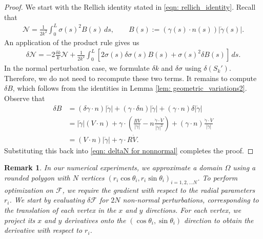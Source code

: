 \documentclass{amsart}
\theoremstyle{plain}
\newtheorem{remark}[theorem]{Remark}
\begin{document}
\begin{proof}
  We start with the Rellich identity stated in \eqref{eqn: rellich_identity}.
  Recall that
    \begin{align}
      \mathcal{N} = \frac{1}{2k^2}\int_0^L\sigma(s)^2B(s)\,ds,\quad\quad B(s):=(\gamma(s)\cdot n(s))|\dot\gamma(s)|.
    \end{align}
  An application of the product rule gives us 
    \begin{align}\label{eqn: deltaN for nonnormal}
      \delta\mathcal{N}
      =-2\frac{\delta k}{k}\mathcal{N}+\frac{1}{2k^2}\int_0^L\left[2\sigma(s)\delta\sigma(s) B(s) + \sigma(s)^2\delta B(s)
      \right]\,ds.
    \end{align}
  In the normal perturbation case, we formulate $\delta k$ and $\delta\sigma$ using $\delta(S_k')$.
  Therefore, we do not need to recompute these two terms.
  It remains to compute $\delta B$, which follows from the identities in Lemma \ref{lem: geometric_variations2}.
  Observe that
  \begin{equation}
    \begin{aligned}
      \delta B
      &=(\delta\gamma\cdot n)|\dot\gamma|+(\gamma\cdot\delta n)|\dot\gamma|+(\gamma\cdot n)\delta|\dot\gamma|\\
      &=|\dot\gamma|(V\cdot n) 
      +\gamma\cdot\left(\frac{R\dot V}{|\dot\gamma|}-n\frac{\dot\gamma\cdot\dot V}{|\dot\gamma|^2}\right)
      +(\gamma\cdot n)\frac{\dot\gamma\cdot\dot V}{|\dot\gamma|}\\
      &=(V\cdot n)|\dot\gamma|+\gamma\cdot R\dot V.
    \end{aligned}
  \end{equation}
  Substituting this back into \eqref{eqn: deltaN for nonnormal} completes the proof.
\end{proof}
\begin{remark}
\label{rem:grad-num}
In our numerical experiments, we approximate a domain $\Omega$ using a rounded polygon with $N$ vertices $(r_i\cos\theta_i,r_i\sin\theta_i)_{i=1,2,\dots N}$.
To perform optimization on $\mathcal{F}$, we require the gradient with respect to the radial parameters $r_i$.
We start by evaluating $\delta\mathcal{F}$ for $2N$ non-normal perturbations, corresponding to the translation of each vertex in the $x$ and $y$ directions.
For each vertex, we project its $x$ and $y$ derivatives onto the $(\cos\theta_i,\sin\theta_i)$ direction to obtain the derivative with respect to $r_i$.
\end{remark}
\end{document}
